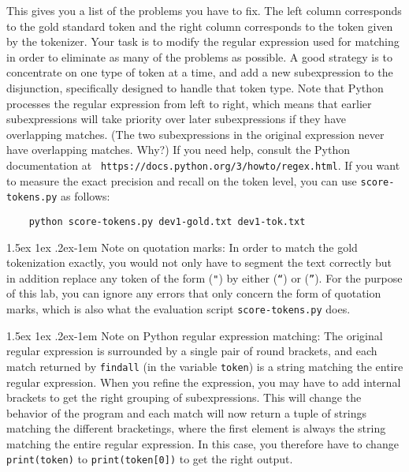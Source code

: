 \documentclass[11pt]{article}
\makeatletter
\renewcommand{\paragraph}{%
  \@startsection{paragraph}{4}%
  {\z@}{1.5ex \@plus 1ex \@minus .2ex}{-1em}%
  {\normalfont\normalsize\bfseries}%
}\makeatother
\makeatother
\begin{document}
\noindent
This gives you a list of the problems you have to fix.  The left column
corresponds to the gold standard token and the right column corresponds to the
token given by the tokenizer. Your task is to modify the regular expression
used for matching in order to eliminate as many of the problems as possible. A
good strategy is to concentrate on one type of token at a time, and add a new
subexpression to the disjunction, specifically designed to handle that token
type. Note that Python processes the regular expression from left to right,
which means that earlier subexpressions will take priority over later
subexpressions if they have overlapping matches. (The two subexpressions in the
original expression never have overlapping matches. Why?) If you need help,
consult the Python documentation at {\tt
https://docs.python.org/3/howto/regex.html}. If you want to measure the exact
precision and recall on the token level, you can use {\tt score-tokens.py} as
follows:
\begin{verbatim}
    python score-tokens.py dev1-gold.txt dev1-tok.txt
\end{verbatim}


\paragraph{Note on quotation marks:} In order to match the gold
tokenization exactly, you would not only have to segment the text
correctly but in addition replace any token of the form ({\tt "}) by
either ({\tt ``}) or ({\tt ''}). For the purpose of this lab,
you can ignore any errors that only concern the form of quotation
marks, which is also what the evaluation script {\tt score-tokens.py}
does.

\paragraph{Note on Python regular expression matching:} The original
regular expression is surrounded by a single pair of round brackets,
and each match returned by {\tt findall} (in the variable {\tt token})
is a string matching the entire regular expression. When you refine
the expression, you may have to add internal brackets to get the right
grouping of subexpressions. This will change the behavior of the
program and each match will now return a tuple of strings matching the
different bracketings, where the first element is always the string
matching the entire regular expression. In this case, you therefore
have to change {\tt print(token)} to {\tt print(token[0])} to get the
right output.
 
\end{document}
